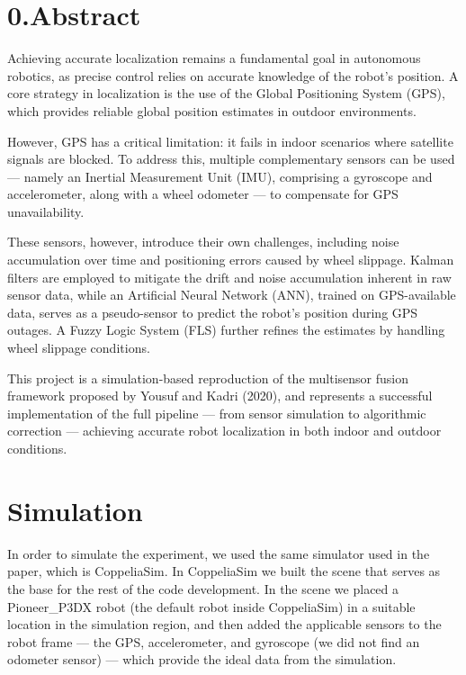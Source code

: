 \documentclass[11pt,a4paper]{article}
\begin{document}
\section*{0.\quad Abstract}

Achieving accurate localization remains a fundamental goal in autonomous robotics,
as precise control relies on accurate knowledge of the robot's position. A core
strategy in localization is the use of the Global Positioning System (GPS), which
provides reliable global position estimates in outdoor environments.

However, GPS has a critical limitation: it fails in indoor scenarios where
satellite signals are blocked. To address this, multiple complementary sensors can
be used --- namely an Inertial Measurement Unit (IMU), comprising a gyroscope and
accelerometer, along with a wheel odometer --- to compensate for GPS unavailability.

These sensors, however, introduce their own challenges, including noise accumulation
over time and positioning errors caused by wheel slippage. Kalman filters are
employed to mitigate the drift and noise accumulation inherent in raw sensor data,
while an Artificial Neural Network (ANN), trained on GPS-available data, serves as a
pseudo-sensor to predict the robot's position during GPS outages. A Fuzzy Logic
System (FLS) further refines the estimates by handling wheel slippage conditions.

This project is a simulation-based reproduction of the multisensor fusion framework
proposed by Yousuf and Kadri (2020), and represents a successful implementation of
the full pipeline --- from sensor simulation to algorithmic correction ---
achieving accurate robot localization in both indoor and outdoor conditions.

\section{Simulation}

In order to simulate the experiment, we used the same simulator used in the paper,
which is CoppeliaSim. In CoppeliaSim we built the scene that serves as the base for
the rest of the code development. In the scene we placed a Pioneer\_P3DX robot (the
default robot inside CoppeliaSim) in a suitable location in the simulation region,
and then added the applicable sensors to the robot frame --- the GPS, accelerometer,
and gyroscope (we did not find an odometer sensor) --- which provide the ideal data
from the simulation.
\end{document}
